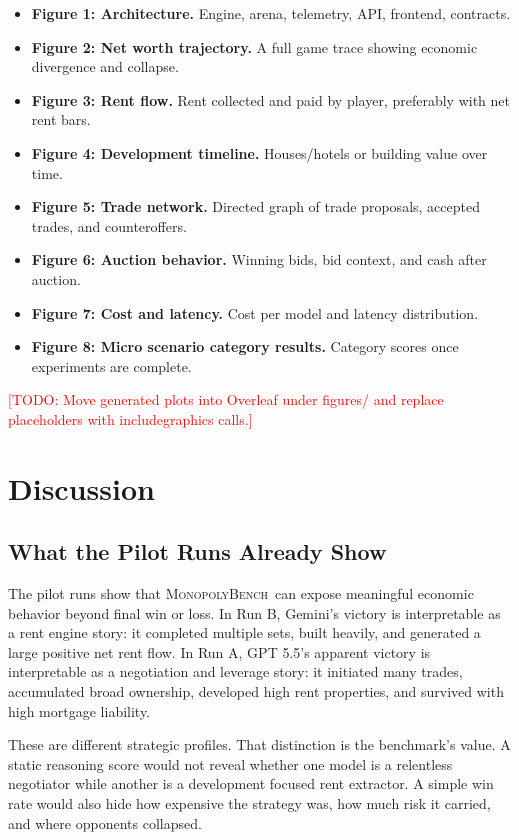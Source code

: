 \documentclass[conference]{IEEEtran}
\newcommand{\Bench}{\textsc{MonopolyBench}}
\newcommand{\todo}[1]{\textcolor{red}{[TODO: #1]}}
\begin{document}
\begin{itemize}
    \item \textbf{Figure 1: Architecture.} Engine, arena, telemetry, API, frontend, contracts.
    \item \textbf{Figure 2: Net worth trajectory.} A full game trace showing economic divergence and collapse.
    \item \textbf{Figure 3: Rent flow.} Rent collected and paid by player, preferably with net rent bars.
    \item \textbf{Figure 4: Development timeline.} Houses/hotels or building value over time.
    \item \textbf{Figure 5: Trade network.} Directed graph of trade proposals, accepted trades, and counteroffers.
    \item \textbf{Figure 6: Auction behavior.} Winning bids, bid context, and cash after auction.
    \item \textbf{Figure 7: Cost and latency.} Cost per model and latency distribution.
    \item \textbf{Figure 8: Micro scenario category results.} Category scores once experiments are complete.
\end{itemize}

\todo{Move generated plots into Overleaf under figures/ and replace placeholders with includegraphics calls.}

\section{Discussion}
\label{sec:discussion}

\subsection{What the Pilot Runs Already Show}

The pilot runs show that \Bench\ can expose meaningful economic behavior beyond final win or loss. In Run B, Gemini's victory is interpretable as a rent engine story: it completed multiple sets, built heavily, and generated a large positive net rent flow. In Run A, GPT 5.5's apparent victory is interpretable as a negotiation and leverage story: it initiated many trades, accumulated broad ownership, developed high rent properties, and survived with high mortgage liability.

These are different strategic profiles. That distinction is the benchmark's value. A static reasoning score would not reveal whether one model is a relentless negotiator while another is a development focused rent extractor. A simple win rate would also hide how expensive the strategy was, how much risk it carried, and where opponents collapsed.
\end{document}
